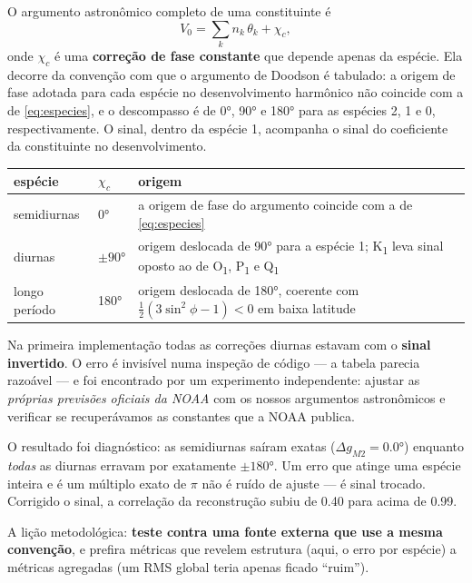 \documentclass[11pt,a4paper,oneside]{report}
\theoremstyle{definition}
\theoremstyle{plain}
\theoremstyle{remark}
\begin{document}
O argumento astronômico completo de uma constituinte é
\begin{equation}
V_0=\sum_k n_k\,\theta_k+\chi_c ,
\end{equation}
onde $\chi_c$ é uma \textbf{correção de fase constante} que depende apenas da
espécie. Ela decorre da convenção com que o argumento de Doodson é tabulado: a
origem de fase adotada para cada espécie no desenvolvimento harmônico não
coincide com a de \eqref{eq:especies}, e o descompasso é de \ang{0}, \ang{90} e
\ang{180} para as espécies 2, 1 e 0, respectivamente. O sinal, dentro da espécie
1, acompanha o sinal do coeficiente da constituinte no desenvolvimento.

\begin{center}
\small
\begin{tabular}{@{}llp{8.2cm}@{}}
\toprule
espécie & $\chi_c$ & origem \\
\midrule
semidiurnas & \ang{0} & a origem de fase do argumento coincide com a de \eqref{eq:especies} \\
diurnas & $\pm\ang{90}$ & origem deslocada de \ang{90} para a espécie 1; K\textsubscript{1} leva sinal oposto ao de O\textsubscript{1}, P\textsubscript{1} e Q\textsubscript{1} \\
longo período & \ang{180} & origem deslocada de \ang{180}, coerente com $\tfrac12(3\sin^{2}\phi-1)<0$ em baixa latitude \\
\bottomrule
\end{tabular}
\end{center}

\begin{alerta}
Na primeira implementação todas as correções diurnas estavam com o
\textbf{sinal invertido}. O erro é invisível numa inspeção de código — a tabela
parecia razoável — e foi encontrado por um experimento independente: ajustar as
\emph{próprias previsões oficiais da NOAA} com os nossos argumentos
astronômicos e verificar se recuperávamos as constantes que a NOAA publica.

O resultado foi diagnóstico: as semidiurnas saíram exatas
($\Delta g_{M2}=\ang{0.0}$) enquanto \emph{todas} as diurnas erravam por
exatamente $\pm\ang{180}$. Um erro que atinge uma espécie inteira e é um
múltiplo exato de $\pi$ não é ruído de ajuste — é sinal trocado. Corrigido o
sinal, a correlação da reconstrução subiu de \num{0.40} para acima de
\num{0.99}.

A lição metodológica: \textbf{teste contra uma fonte externa que use a mesma
convenção}, e prefira métricas que revelem estrutura (aqui, o erro por espécie)
a métricas agregadas (um RMS global teria apenas ficado ``ruim'').
\end{alerta}
\end{document}
